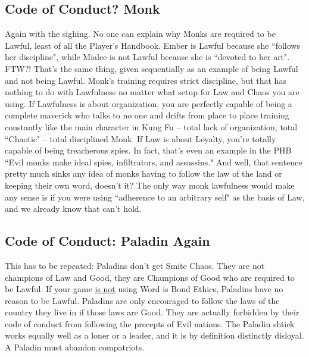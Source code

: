 \subsection{Code of Conduct? Monk}
Again with the sighing. No one can explain why Monks are required to be Lawful, least of all the Player's Handbook. Ember is Lawful because she ``follows her discipline", while Mialee is not Lawful because she is ``devoted to her art". FTW?! That's the same thing, given sequentially as an example of being Lawful and not being Lawful. Monk's training requires strict discipline, but that has nothing to do with Lawfulness no matter what setup for Law and Chaos you are using. If Lawfulness is about organization, you are perfectly capable of being a complete maverick who talks to no one and drifts from place to place training constantly like the main character in Kung Fu -- total lack of organization, total ``Chaotic" -- total disciplined Monk. If Law is about Loyalty, you're totally capable of being treacherous spies. In fact, that's even an example in the PHB ``Evil monks make ideal spies, infiltrators, and assassins." And well, that sentence pretty much sinks any idea of monks having to follow the law of the land or keeping their own word, doesn't it? The only way monk lawfulness would make any sense is if you were using ``adherence to an arbitrary self" as the basis of Law, and we already know that can't hold.

\subsection{Code of Conduct: Paladin Again}
This has to be repeated: Paladins don't get Smite Chaos. They are not champions of Law and Good, they are Champions of Good who are required to be Lawful. If your game \underline{is not} using Word is Bond Ethics, Paladins have no reason to be Lawful. Paladins are only encouraged to follow the laws of the country they live in if those laws are Good. They are actually forbidden by their code of conduct from following the precepts of Evil nations. The Paladin shtick works equally well as a loner or a leader, and it is by definition distinctly disloyal. A Paladin must abandon compatriots.